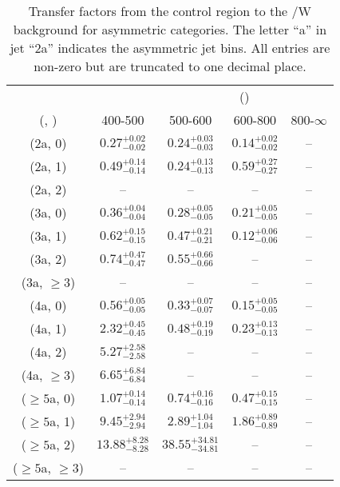 \begin{table}[h!]
\tiny
\centering
\caption{Transfer factors from the \gj control region to the \ttbar/W background for asymmetric categories. The letter ``a'' in jet \eg ``2a''  indicates the asymmetric jet bins. All entries are non-zero but are truncated to one decimal place.\label{tab:tf_gj_ttw_asym}}
\begin{tabular}
{ccccc}
	\hline\hline
&	& \multicolumn{4}{c}{\scalht (\gev)} \\ 
	 (\njet,  \nb) & 400-500 & 500-600 & 600-800 & 800-$\infty$ \\ [0.8ex] 
\hline
	(2a, 0) & $0.27^{+ 0.02 }_{- 0.02 }$ & $0.24^{+ 0.03 }_{- 0.03 }$ & $0.14^{+ 0.02 }_{- 0.02 }$ & -- \\[0.5ex] 
	(2a, 1) & $0.49^{+ 0.14 }_{- 0.14 }$ & $0.24^{+ 0.13 }_{- 0.13 }$ & $0.59^{+ 0.27 }_{- 0.27 }$ & -- \\[0.5ex] 
	(2a, 2) & -- & -- & -- & -- \\[0.5ex] 
	(3a, 0) & $0.36^{+ 0.04 }_{- 0.04 }$ & $0.28^{+ 0.05 }_{- 0.05 }$ & $0.21^{+ 0.05 }_{- 0.05 }$ & -- \\[0.5ex] 
	(3a, 1) & $0.62^{+ 0.15 }_{- 0.15 }$ & $0.47^{+ 0.21 }_{- 0.21 }$ & $0.12^{+ 0.06 }_{- 0.06 }$ & -- \\[0.5ex] 
	(3a, 2) & $0.74^{+ 0.47 }_{- 0.47 }$ & $0.55^{+ 0.66 }_{- 0.66 }$ & -- & -- \\[0.5ex] 
	(3a, $\ge3$) & -- & -- & -- & -- \\[0.5ex] 
	(4a, 0) & $0.56^{+ 0.05 }_{- 0.05 }$ & $0.33^{+ 0.07 }_{- 0.07 }$ & $0.15^{+ 0.05 }_{- 0.05 }$ & -- \\[0.5ex] 
	(4a, 1) & $2.32^{+ 0.45 }_{- 0.45 }$ & $0.48^{+ 0.19 }_{- 0.19 }$ & $0.23^{+ 0.13 }_{- 0.13 }$ & -- \\[0.5ex] 
	(4a, 2) & $5.27^{+ 2.58 }_{- 2.58 }$ & -- & -- & -- \\[0.5ex] 
	(4a, $\ge3$) & $6.65^{+ 6.84 }_{- 6.84 }$ & -- & -- & -- \\[0.5ex] 
	($\ge5$a, 0) & $1.07^{+ 0.14 }_{- 0.14 }$ & $0.74^{+ 0.16 }_{- 0.16 }$ & $0.47^{+ 0.15 }_{- 0.15 }$ & -- \\[0.5ex] 
	($\ge5$a, 1) & $9.45^{+ 2.94 }_{- 2.94 }$ & $2.89^{+ 1.04 }_{- 1.04 }$ & $1.86^{+ 0.89 }_{- 0.89 }$ & -- \\[0.5ex] 
	($\ge5$a, 2) & $13.88^{+ 8.28 }_{- 8.28 }$ & $38.55^{+ 34.81 }_{- 34.81 }$ & -- & -- \\[0.5ex] 
	($\ge5$a, $\ge3$) & -- & -- & -- & -- \\[0.5ex] 
	\hline
	\hline
\end{tabular}
\end{table}
